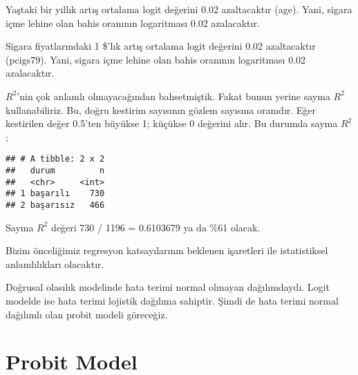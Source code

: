\documentclass[
]{book}
\newenvironment{Shaded}{\begin{snugshade}}{\end{snugshade}}
\newcommand{\DataTypeTok}[1]{\textcolor[rgb]{0.13,0.29,0.53}{#1}}
\newcommand{\DecValTok}[1]{\textcolor[rgb]{0.00,0.00,0.81}{#1}}
\newcommand{\FloatTok}[1]{\textcolor[rgb]{0.00,0.00,0.81}{#1}}
\newcommand{\KeywordTok}[1]{\textcolor[rgb]{0.13,0.29,0.53}{\textbf{#1}}}
\newcommand{\NormalTok}[1]{#1}
\newcommand{\OperatorTok}[1]{\textcolor[rgb]{0.81,0.36,0.00}{\textbf{#1}}}
\newcommand{\StringTok}[1]{\textcolor[rgb]{0.31,0.60,0.02}{#1}}
\begin{document}
Yaştaki bir yıllık artış ortalama logit değerini 0.02 azaltacaktır (age). Yani, sigara içme lehine olan bahis oranının logaritması 0.02 azalacaktır.

Sigara fiyatlarındaki 1 \$'lık artış ortalama logit değerini 0.02 azaltacaktır (pcigs79). Yani, sigara içme lehine olan bahis oranının logaritması 0.02 azalacaktır.

\(R^2\)'nin çok anlamlı olmayacağından bahsetmiştik. Fakat bunun yerine sayma \(R^2\) kullanabiliriz. Bu, doğru kestirim sayısının gözlem sayısına oranıdır. Eğer kestirilen değer 0.5'ten büyükse 1; küçükse 0 değerini alır. Bu durumda sayma \(R^2\);

\begin{Shaded}
\end{Shaded}

\begin{verbatim}
## # A tibble: 2 x 2
##   durum         n
##   <chr>     <int>
## 1 başarılı    730
## 2 başarısız   466
\end{verbatim}

Sayma \(R^2\) değeri 730 / 1196 = 0.6103679 ya da \%61 olacak.

Bizim önceliğimiz regresyon katsayılarının beklenen işaretleri ile istatistiksel anlamlılıkları olacaktır.

Doğrusal olasılık modelinde hata terimi normal olmayan dağılımdaydı. Logit modelde ise hata terimi lojistik dağılıma sahiptir. Şimdi de hata terimi normal dağılımlı olan probit modeli göreceğiz.

\hypertarget{probit-model}{%
\section{Probit Model}\label{probit-model}}
\end{document}
